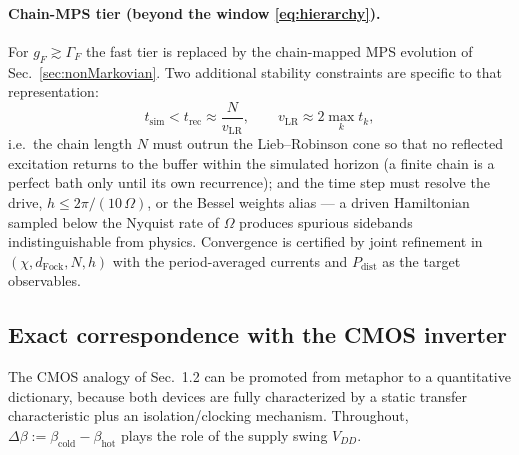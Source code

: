 \documentclass[11pt,a4paper]{article}
\theoremstyle{definition}
\theoremstyle{remark}
\begin{document}
\paragraph{Chain-MPS tier (beyond the window \eqref{eq:hierarchy}).}
For $g_F\gtrsim\Gamma_F$ the fast tier is replaced by the chain-mapped
MPS evolution of Sec.~\ref{sec:nonMarkovian}. Two additional stability
constraints are specific to that representation:
\begin{equation}
t_{\mathrm{sim}} < t_{\mathrm{rec}} \approx \frac{N}{v_{\mathrm{LR}}},
\qquad
v_{\mathrm{LR}} \approx 2\max_k t_k ,
\label{eq:recurrence}
\end{equation}
i.e.\ the chain length $N$ must outrun the Lieb--Robinson cone so that
no reflected excitation returns to the buffer within the simulated
horizon (a finite chain is a perfect bath only until its own
recurrence); and the time step must resolve the drive,
$h \le 2\pi/(10\,\Omega)$, or the Bessel weights alias --- a driven
Hamiltonian sampled below the Nyquist rate of $\Omega$ produces
spurious sidebands indistinguishable from physics. Convergence is
certified by joint refinement in
$(\chi, d_{\mathrm{Fock}}, N, h)$ with the period-averaged currents
and $P_{\mathrm{dist}}$ as the target observables.
 
\subsection{Exact correspondence with the CMOS inverter}
\label{sec:cmos}
The CMOS analogy of Sec.~1.2 can be promoted from metaphor to a
quantitative dictionary, because both devices are fully characterized
by a static transfer characteristic plus an isolation/clocking
mechanism. Throughout, $\Delta\beta := \beta_{\mathrm{cold}} -
\beta_{\mathrm{hot}}$ plays the role of the supply swing
$V_{DD}$.
 
\end{document}
